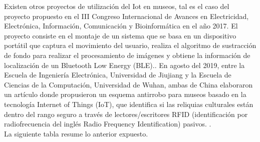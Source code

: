        Existen otros proyectos de utilización del Iot en museos, tal es el caso del proyecto propuesto en el III Congreso Internacional de Avances en Electricidad, Electrónica, Información, Comunicación y Bioinformática en el año 2017. El proyecto consiste en el montaje de un sistema que se basa en un dispositivo portátil que captura el movimiento del usuario, realiza el algoritmo de sustracción de fondo para realizar el procesamiento de imágenes y obtiene la información de localización de un Bluetooth Low Energy (BLE).\cite{proyectoIotdispositivoPortatil}. En agosto del 2019, entre la Escuela de Ingeniería Electrónica, Universidad de Jiujiang y la Escuela de Ciencias de la Computación, Universidad de Wuhan, ambas de China elaboraron un artículo donde propusieron un esquema antirrobo para museos basado en la tecnología Internet of Things (IoT), que identifica si las reliquias culturales están dentro del rango seguro a través de lectores/escritores RFID (identificación por radiofrecuencia del inglés Radio Frequency Identification) pasivos. \cite{chinaSistemaSeguridadRFID}.\\

        La siguiente tabla resume lo anterior expuesto.

